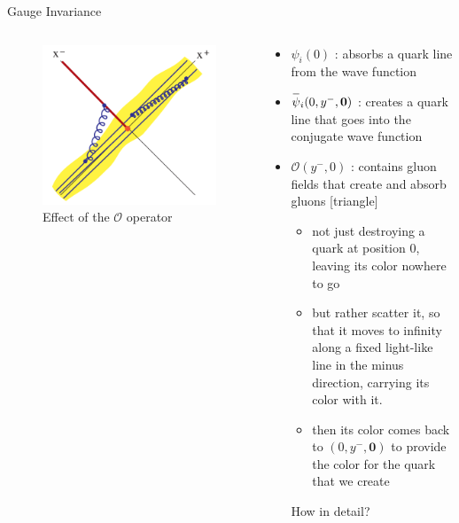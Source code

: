 \documentclass[aspectratio=169,xcolor=dvipsnames]{beamer}
\newcommand{\overbar}[1]{
	\mkern 1.5mu \overline{\mkern-1.5mu\raisebox{0pt}[\dimexpr\height+0.5mm\relax]{$#1$}\mkern-1.5mu}\mkern 1.5mu
}
\begin{document}
\begin{frame}{Gauge Invariance}
	\begin{columns}[T]
		\begin{column}{.5\textwidth}
			\begin{figure}
				\centering
				\includegraphics[width=.8\textwidth]{eikonal}
				\caption{Effect of the $\mathcal{O}$ operator}
			\end{figure}
		\end{column}
		\begin{column}{.5\textwidth}
			\begin{itemize}
				\item $\psi_i(0)$ : absorbs a quark line from the wave function
				\item $\overbar{\psi}_i(0,y^-,\mathbf{0})$ : creates a quark line that goes into the conjugate wave function
				\item $\mathcal{O}(y^-,0)$ : contains gluon fields that create and absorb gluons \vskip0.05in
				[triangle]
				\begin{itemize}
					\item not just destroying a quark at position $0$, leaving its color nowhere to go
					\item but rather scatter it, so that it moves to infinity along a fixed light-like line in the minus
					direction, carrying its color with it.
					\item  then its color comes back to $(0,y^-,\mathbf{0})$ to provide the color for the quark that we create 
				\end{itemize}
				\MVRightArrow{} How in detail?
			\end{itemize}
		\end{column}
	\end{columns}
\end{frame}
\end{document}
